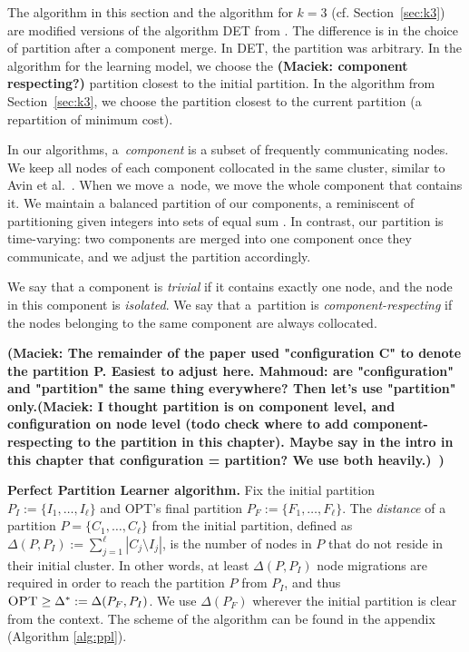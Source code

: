 \documentclass[a4paper,anonymous,USenglish]{lipics-v2019}
\newcommand{\OPT}{\textsc{OPT}\xspace}
\newcommand\mahmoud[1]{\color{orange}\textbf{Mahmoud: #1~}\color{black}}
\newcommand\maciek[1]{\color{brown}\textbf{(Maciek: #1)}\color{black}}
\begin{document}
The algorithm in this section and the algorithm for $k=3$ (cf. Section~\ref{sec:k3}) are modified versions of the algorithm DET from \cite{repartition-disc}.
The difference is in the choice of partition after a component merge.
In DET, the partition was arbitrary.
In the algorithm for the learning model, we choose the \maciek{component respecting?} partition closest to the initial partition.
In the algorithm from Section~\ref{sec:k3}, we choose the partition closest to the current partition (a repartition of minimum cost).

\medskip

In our algorithms, a~\emph{component} is a subset of frequently communicating nodes.
We keep all nodes of each component collocated in the same cluster, similar to Avin et al.~\cite{repartition-disc}.
When we  move a~node, we move the whole component that contains it.
We maintain a balanced partition of our components,
a reminiscent of partitioning given integers into sets of equal sum \cite{integer-partitions-book}.
In contrast, our partition is time-varying:  two components are merged into one component once they communicate, and we adjust the partition accordingly.

We say that a component is \emph{trivial} if it contains exactly one node,
and the node in this component is \emph{isolated}.
We say that a~partition is \emph{component-respecting}
if the nodes belonging to the same component are always collocated.


\maciek{The remainder of the paper used "configuration C" to denote the partition P. Easiest to adjust here. \mahmoud{are "configuration" and "partition" the same thing everywhere? Then let's use "partition" only.\maciek{I thought partition is on component level, and configuration on node level (todo check where to add component-respecting to the partition in this chapter). Maybe say in the intro in this chapter that configuration = partition? We use both heavily.}}}

\noindent
\textbf{Perfect Partition Learner algorithm.}
Fix the initial partition
$P_I :=\{ I_1, \dots, I_{\ell}\}$ and \OPT's final partition
$P_F := \{F_1, \dots, F_{\ell}\}$.
The \emph{distance} of a partition
 $P = \{C_1, \dots, C_{\ell}\}$ from the initial partition,
defined as 
$\Delta(P, P_I) := \sum_{j=1}^{\ell} | C_j \setminus I_j |$,
 is the number of nodes in $P$ that do not reside in their initial cluster.
In other words,
at least $\Delta(P, P_I)$ node migrations are required in order to reach the partition $P$ from $P_I$, and thus
$\OPT \geq \Delta^*:= \Delta(P_F, P_I) $.
We  use $ \Delta(P_F) $ wherever the initial partition is clear from the context.
The scheme of the algorithm can be found in the  appendix (Algorithm \ref{alg:ppl}).
\end{document}
